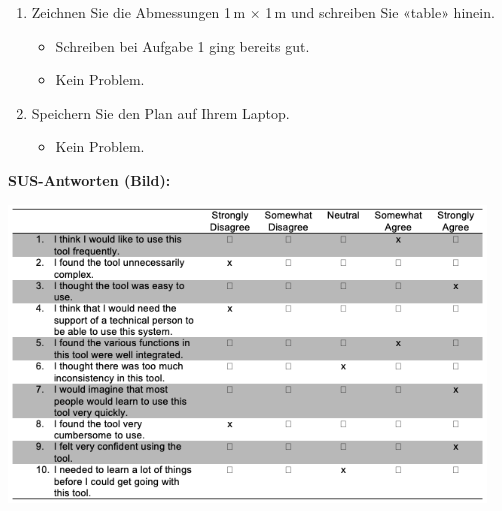 \begin{enumerate}
    \item Zeichnen Sie die Abmessungen 1\,m $\times$ 1\,m und schreiben Sie «table» hinein.
    \begin{itemize}
        \item Schreiben bei Aufgabe 1 ging bereits gut.
        \item Kein Problem.
    \end{itemize}

    \item Speichern Sie den Plan auf Ihrem Laptop.
    \begin{itemize}
        \item Kein Problem.
    \end{itemize}
\end{enumerate}

\clearpage

\textbf{SUS-Antworten (Bild):}
\begin{center}
    \includegraphics[width=0.95\textwidth]{graphics/sus_person6.png}
\end{center}


